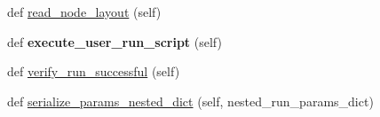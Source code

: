 \begin{DoxyCompactItemize}
\item 
def \hyperlink{classcodar_1_1cheetah_1_1report__generator_1_1___run_parser_a29eee17a065ece5164a6aab53911737b}{read\+\_\+node\+\_\+layout} (self)
\item 
\mbox{\label{classcodar_1_1cheetah_1_1report__generator_1_1___run_parser_a6f472eca96bec87e42cda64c9700a878}} 
def {\bfseries execute\+\_\+user\+\_\+run\+\_\+script} (self)
\item 
def \hyperlink{classcodar_1_1cheetah_1_1report__generator_1_1___run_parser_a7903f37cfae3abbf922c55e83b214567}{verify\+\_\+run\+\_\+successful} (self)
\item 
def \hyperlink{classcodar_1_1cheetah_1_1report__generator_1_1___run_parser_acb1d5e6c741abe1fe06169eb3f260e2a}{serialize\+\_\+params\+\_\+nested\+\_\+dict} (self, nested\+\_\+run\+\_\+params\+\_\+dict)
\end{DoxyCompactItemize}
